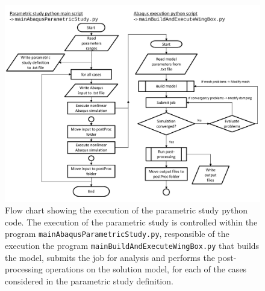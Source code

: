     \begin{figure}[!htpb]
      \centering
      \includegraphics[width=1.0 \textwidth]{figures/model/flowChart}
      \caption[Flow chart showing the execution of the parametric study python code]{Flow chart showing the execution of the parametric study python code. The execution of the parametric study is controlled within the program \texttt{mainAbaqusParametricStudy.py}, responsible of the execution the program \texttt{mainBuildAndExecuteWingBox.py} that builds the model, submits the job for analysis and performs the post-processing operations on the solution model, for each of the cases considered in the parametric study definition.}\label{fig:flowChart}
    \end{figure}